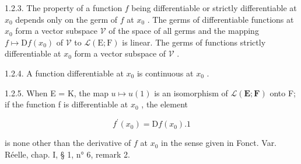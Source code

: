 1.2.3. The property of a function \(f\) being differentiable or strictly differentiable at \(x_{0}\) depends only on the germ of \(f\) at \(x_{0}\) . The germs of differentiable functions at \(x_{0}\) form a vector subspace \(\mathcal{V}\) of the space of all germs and the mapping \(f\mapsto\mathrm{D}f(x_{0})\) of \(\mathcal{V}\) to \(\mathcal{L}(\mathrm{E};\mathrm{F})\) is linear. The germs of functions strictly differentiable at \(x_{0}\) form a vector subspace of \(\mathcal{V}\) .

1.2.4. A function differentiable at \(x_0\) is continuous at \(x_0\) .

1.2.5. When E = K, the map \(u \mapsto u(1)\) is an isomorphism of \(\mathcal{L}(\mathbf{E}; \mathbf{F})\) onto F; if the function f is differentiable at \(x_{0}\) , the element

\[
f ^ {\prime} (x _ {0}) = \mathrm{D} f (x _ {0}). 1
\]

is none other than the derivative of \(f\) at \(x_0\) in the sense given in Fonct. Var. Réelle, chap. I, § 1, n° 6, remark 2.

